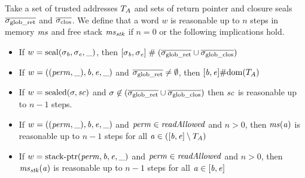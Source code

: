 \documentclass[a4paper]{article}
\begin{document}
Take a set of trusted addresses $T_{A}$ and sets of return pointer and closure seals $\overline{\sigma_{\mathrm{glob\_ret}}}$ and $\sigcloss$.
We define that a word $w$ is reasonable up to $n$ steps in memory $\mathit{ms}$ and
free stack $\mathit{ms}_{\mathit{stk}}$ if $n=0$
or the following implications hold.
\begin{definition}
  \label{def:reasonable-word}
  \begin{itemize}
  \item If $w = \mathrm{seal}(\sigma_{\mathit{b}},\sigma_{\mathit{e}},\_)$, then
    $[\sigma_{\mathit{b}},\sigma_{\mathit{e}}] \mathrel{\#} (\overline{\sigma_{\mathrm{glob\_ret}}} \cup \overline{\sigma_{\mathrm{glob\_clos}}})$
  \item If $w = ((\mathit{perm},\_),\mathit{b},\mathit{e},\_)$ and $\overline{\sigma_{\mathrm{glob\_ret}}} \neq \emptyset$, then $[\mathit{b},\mathit{e}] \# \mathrm{dom}(T_{A})$
  \item If $w = \mathrm{sealed}(\sigma,\mathit{sc})$ and $\sigma \not\in (\overline{\sigma_{\mathrm{glob\_ret}}}\cup
    \overline{\sigma_{\mathrm{glob\_clos}}})$ then $\mathit{sc}$ is reasonable up to $n - 1$ steps.
  \item If $w = ((\mathit{perm},\_),\mathit{b},\mathit{e},\_)$ and $\perm \in \readAllowed{}$
    and $n > 0$, then $\mathit{ms}(\mathit{a})$ is reasonable up to $n - 1$ steps for all
    $\mathit{a} \in ([\mathit{b},\mathit{e}] \setminus T_{A})$
  \item If $w = \mathrm{stack\text{-}ptr}(\mathit{perm},\mathit{b},\mathit{e},\_)$ and $\perm \in \readAllowed{}$
    and $n > 0$, then $\mathit{ms}_{\mathit{stk}}(\mathit{a})$ is reasonable up to $n - 1$ steps for
    all $\mathit{a} \in [\mathit{b},\mathit{e}]$
  \end{itemize}
\end{definition}
\end{document}
